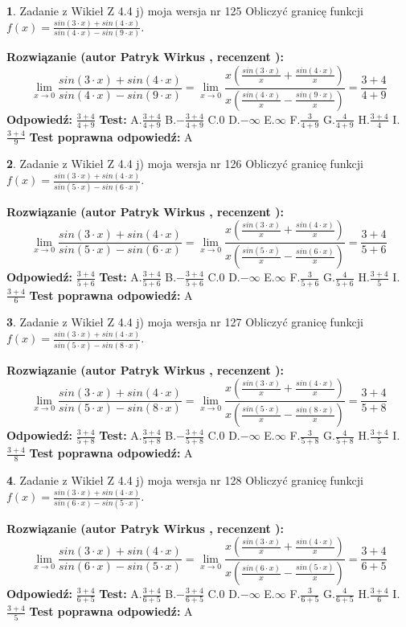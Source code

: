 \documentclass[12pt, a4paper]{article}
\theoremstyle{definition} %
\newtheorem{zad}{}
\newcommand{\zadStart}[1]{\begin{zad}#1\newline}
\newcommand{\zadStop}{\end{zad}}
\newcommand{\rozwStart}[2]{\noindent \textbf{Rozwiązanie (autor #1 , recenzent #2): }\newline}
\newcommand{\rozwStop}{\newline}
\newcommand{\odpStart}{\noindent \textbf{Odpowiedź:}\newline}
\newcommand{\odpStop}{\newline}
\newcommand{\testStart}{\noindent \textbf{Test:}\newline}
\newcommand{\testStop}{\newline}
\newcommand{\kluczStart}{\noindent \textbf{Test poprawna odpowiedź:}\newline}
\newcommand{\kluczStop}{\newline}
\begin{document}
\zadStart{Zadanie z Wikieł Z 4.4 j) moja wersja nr 125}
Obliczyć granicę funkcji $f(x)=\frac{sin(3\cdot x) +sin(4\cdot x)}{sin(4\cdot x) -sin(9\cdot x)}$.
\zadStop
\rozwStart{Patryk Wirkus}{}
$$\lim\limits_{x\to 0}\frac{sin(3\cdot x) +sin(4\cdot x)}{sin(4\cdot x) -sin(9\cdot x)}=\lim\limits_{x\to 0}\frac{x(\frac{sin(3\cdot x)}{x}+\frac{sin(4\cdot x)}{x})}{x(\frac{sin(4\cdot x)}{x}-\frac{sin(9\cdot x)}{x})}=\frac{3+4}{4+9}$$
\rozwStop
\odpStart
$\frac{3+4}{4+9}$
\odpStop
\testStart
A.$\frac{3+4}{4+9}$
B.$-\frac{3+4}{4+9}$
C.$0$
D.$-\infty$
E.$\infty$
F.$\frac{3}{4+9}$
G.$\frac{4}{4+9}$
H.$\frac{3+4}{4}$
I.$\frac{3+4}{9}$
\testStop
\kluczStart
A
\kluczStop



\zadStart{Zadanie z Wikieł Z 4.4 j) moja wersja nr 126}
Obliczyć granicę funkcji $f(x)=\frac{sin(3\cdot x) +sin(4\cdot x)}{sin(5\cdot x) -sin(6\cdot x)}$.
\zadStop
\rozwStart{Patryk Wirkus}{}
$$\lim\limits_{x\to 0}\frac{sin(3\cdot x) +sin(4\cdot x)}{sin(5\cdot x) -sin(6\cdot x)}=\lim\limits_{x\to 0}\frac{x(\frac{sin(3\cdot x)}{x}+\frac{sin(4\cdot x)}{x})}{x(\frac{sin(5\cdot x)}{x}-\frac{sin(6\cdot x)}{x})}=\frac{3+4}{5+6}$$
\rozwStop
\odpStart
$\frac{3+4}{5+6}$
\odpStop
\testStart
A.$\frac{3+4}{5+6}$
B.$-\frac{3+4}{5+6}$
C.$0$
D.$-\infty$
E.$\infty$
F.$\frac{3}{5+6}$
G.$\frac{4}{5+6}$
H.$\frac{3+4}{5}$
I.$\frac{3+4}{6}$
\testStop
\kluczStart
A
\kluczStop



\zadStart{Zadanie z Wikieł Z 4.4 j) moja wersja nr 127}
Obliczyć granicę funkcji $f(x)=\frac{sin(3\cdot x) +sin(4\cdot x)}{sin(5\cdot x) -sin(8\cdot x)}$.
\zadStop
\rozwStart{Patryk Wirkus}{}
$$\lim\limits_{x\to 0}\frac{sin(3\cdot x) +sin(4\cdot x)}{sin(5\cdot x) -sin(8\cdot x)}=\lim\limits_{x\to 0}\frac{x(\frac{sin(3\cdot x)}{x}+\frac{sin(4\cdot x)}{x})}{x(\frac{sin(5\cdot x)}{x}-\frac{sin(8\cdot x)}{x})}=\frac{3+4}{5+8}$$
\rozwStop
\odpStart
$\frac{3+4}{5+8}$
\odpStop
\testStart
A.$\frac{3+4}{5+8}$
B.$-\frac{3+4}{5+8}$
C.$0$
D.$-\infty$
E.$\infty$
F.$\frac{3}{5+8}$
G.$\frac{4}{5+8}$
H.$\frac{3+4}{5}$
I.$\frac{3+4}{8}$
\testStop
\kluczStart
A
\kluczStop



\zadStart{Zadanie z Wikieł Z 4.4 j) moja wersja nr 128}
Obliczyć granicę funkcji $f(x)=\frac{sin(3\cdot x) +sin(4\cdot x)}{sin(6\cdot x) -sin(5\cdot x)}$.
\zadStop
\rozwStart{Patryk Wirkus}{}
$$\lim\limits_{x\to 0}\frac{sin(3\cdot x) +sin(4\cdot x)}{sin(6\cdot x) -sin(5\cdot x)}=\lim\limits_{x\to 0}\frac{x(\frac{sin(3\cdot x)}{x}+\frac{sin(4\cdot x)}{x})}{x(\frac{sin(6\cdot x)}{x}-\frac{sin(5\cdot x)}{x})}=\frac{3+4}{6+5}$$
\rozwStop
\odpStart
$\frac{3+4}{6+5}$
\odpStop
\testStart
A.$\frac{3+4}{6+5}$
B.$-\frac{3+4}{6+5}$
C.$0$
D.$-\infty$
E.$\infty$
F.$\frac{3}{6+5}$
G.$\frac{4}{6+5}$
H.$\frac{3+4}{6}$
I.$\frac{3+4}{5}$
\testStop
\kluczStart
A
\kluczStop
\end{document}
